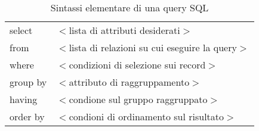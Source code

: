 
\begin{table}
\begin{center}

\begin{tabular}{ll}
select& $<$lista di attributi desiderati$>$\\
from& $<$lista di relazioni su cui eseguire la query$>$\\
where& $<$condizioni di selezione sui record$>$\\
group by& $<$attributo di raggruppamento$>$\\
having& $<$condione sul gruppo raggruppato$>$\\
order by& $<$condioni di ordinamento sul risultato$>$\\
\end{tabular}

\caption{Sintassi elementare di una query SQL}
\label{sqlquery}

\end{center}
\end{table}


